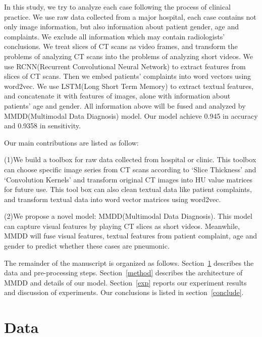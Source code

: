 \documentclass[runningheads]{llncs}
\begin{document}
In this study, we try to analyze each case following the process of clinical practice. We use raw data collected from a major hospital, each case contains not only image information, but also information about patient gender, age and complaints. We exclude all information which may contain radiologists' conclusions.
We treat slices of CT scans as video frames, and transform the problems of analyzing CT scans into the problems of analyzing short videos. We use RCNN(Recurrent Convolutional Neural Network) to extract features from slices of CT scans. Then we embed patients' complaints into word vectors using word2vec\cite{mikolov2013efficient}\cite{mikolov2013distributed}. We use LSTM(Long Short Term Memory) to extract textual features, and concatenate it with features of images, alone with information about patients' age and gender. All information above will be fused and analyzed by MMDD(Multimodal Data Diagnosis) model. Our model achieve 0.945 in accuracy and 0.9358 in sensitivity.

Our main contributions are listed as follow:

(1)We build a toolbox for raw data collected from hospital or clinic. This toolbox can choose specific image series from CT scans according to `Slice Thickness' and `Convolution Kernels' and transform original CT images into HU value matrices for future use. This tool box can also clean textual data like patient complaints, and transform textual data into word vector matrices using word2vec.

(2)We propose a novel model: MMDD(Multimodal Data Diagnosis). This model can capture visual features by playing CT slices as short videos. Meanwhile, MMDD will fuse visual features, textual features from patient complaint, age and gender to predict whether these cases are pneumonic.

The remainder of the manuscript is organized as follows.
Section~\ref{data} describes the data and pre-processing steps. 
Section~\ref{method} describes the architecture of MMDD and details of our model.
Section~\ref{exp} reports our experiment results and discussion of experiments.
Our conclusions is listed in section~\ref{conclude}.

\section{Data}
\label{data}
\end{document}
